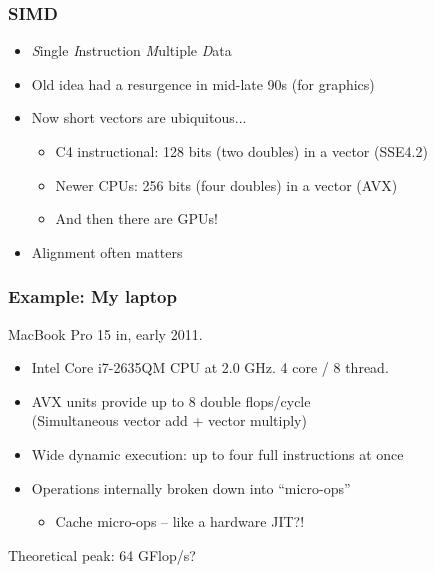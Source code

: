 \documentclass{beamer}
\begin{document}
\begin{frame}
  \frametitle{SIMD}
  
  \begin{itemize}
  \item {\em S}ingle {\em I}nstruction {\em M}ultiple {\em D}ata
  \item Old idea had a resurgence in mid-late 90s (for graphics)
  \item Now short vectors are ubiquitous...
    \begin{itemize}
    \item C4 instructional: 128 bits (two doubles) in a vector (SSE4.2)
    \item Newer CPUs: 256 bits (four doubles) in a vector (AVX)
    \item And then there are GPUs!
    \end{itemize}
  \item Alignment often matters
  \end{itemize}
\end{frame}

\begin{frame}
  \frametitle{Example: My laptop}

  MacBook Pro 15 in, early 2011.
  \begin{itemize}
  \item Intel Core i7-2635QM CPU at 2.0 GHz.  4 core / 8 thread.
  \item AVX units provide up to 8 double flops/cycle \\
        (Simultaneous vector add + vector multiply)
  \item Wide dynamic execution: up to four full instructions at once
  \item Operations internally broken down into ``micro-ops''
    \begin{itemize}
    \item Cache micro-ops -- like a hardware JIT?!
    \end{itemize}
  \end{itemize}
  Theoretical peak: 64 GFlop/s?

\end{frame}
\end{document}
